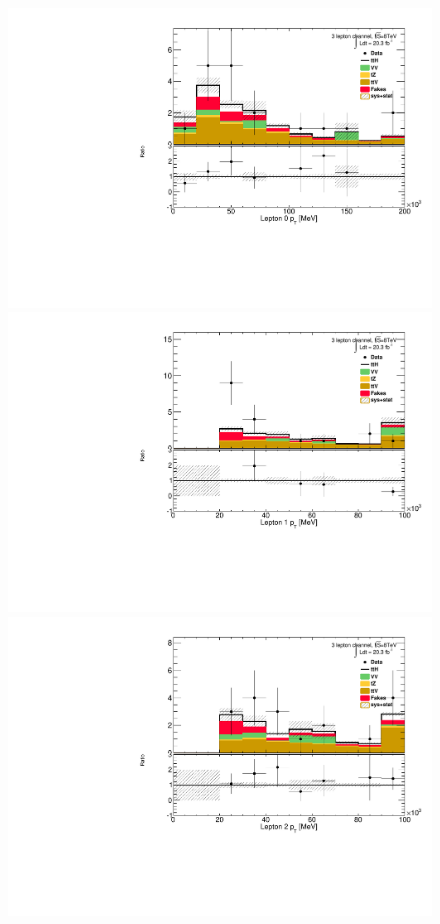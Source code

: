 \begin{figure}[!htbp]
  \begin{minipage}[h]{0.5\textwidth}
    \centering \includegraphics[width=\textwidth]{figs/results/plotCand_3lep_Lep0MLPt}
  \end{minipage}\hfill
  \begin{minipage}[h]{0.5\textwidth}
    \centering \includegraphics[width=\textwidth]{figs/results/plotCand_3lep_Lep1MLPt}
  \end{minipage}\hfill
  \begin{minipage}[h]{0.5\textwidth}
    \centering \includegraphics[width=\textwidth]{figs/results/plotCand_3lep_Lep2MLPt}

\end{minipage}
\end{figure}

